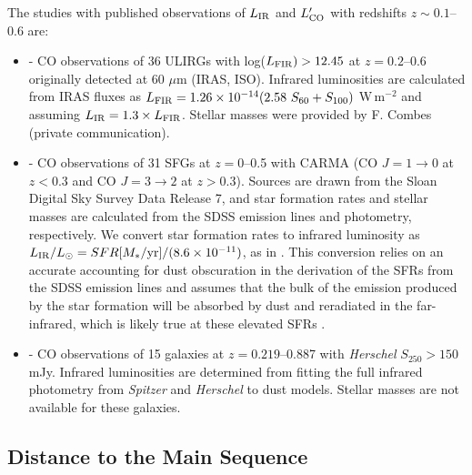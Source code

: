 \documentclass[a4paper,fleqn,usenatbib]{mnras}
\newcommand{\lir}{L_{\rm{IR}}}
\newcommand{\lco}{L'_{\rm{CO}}}
\begin{document}
The studies with published observations of $\lir$ and $\lco$ with redshifts $z \sim 0.1$--0.6 are:
\begin{itemize}
\item \citet{2011A&A...528A.124C} - CO observations of 36 ULIRGs with log($L_{\rm{FIR}}) > 12.45$ at $z = 0.2$--0.6 originally detected at 60 $\mu$m (IRAS, ISO). Infrared luminosities are calculated from IRAS fluxes as $L_{\rm{FIR}} = 1.26 \times 10^{-14} (2.58\ S_{60} + S_{100})$ W\,m$^{-2}$ \citep{1996ARA&A..34..749S} and assuming $L_{\rm{IR}} = 1.3 \times L_{\rm{FIR}}$. Stellar masses were provided by F. Combes (private communication).
\item \citet{2013ApJ...768..132B} - CO observations of 31 SFGs at $z = 0$--0.5 with CARMA (CO $J=1\rightarrow0$ at $z < 0.3$ and CO $J=3\rightarrow2$ at $z > 0.3$).  Sources are drawn from the Sloan Digital Sky Survey Data Release 7, and star formation rates and stellar masses are calculated from the SDSS emission lines and photometry, respectively. We convert star formation rates to infrared luminosity as $\lir / L_{\odot} = SFR [M_{*} / \mathrm{yr}] / (8.6 \times 10^{-11} ) $, as in \citet{2013A&A...558A..67A}. This conversion relies on an accurate accounting for dust obscuration in the derivation of the SFRs from the SDSS emission lines and assumes that the bulk of the emission produced by the star formation will be absorbed by dust and reradiated in the far-infrared, which is likely true at these elevated SFRs \citep{2015ApJ...801...80L}. 
\item \citet{2014ApJ...796...63M} - CO observations of 15 galaxies at $z = 0.219$--0.887 with {\em Herschel} $S_{250} > 150$ mJy. Infrared luminosities are determined from fitting the full infrared photometry from {\em Spitzer} and {\em Herschel} to \citet{2007ApJ...657..810D} dust models. Stellar masses are not available for these galaxies. 
\end{itemize}



\subsection{Distance to the Main Sequence}\label{sec:ms}
\end{document}
